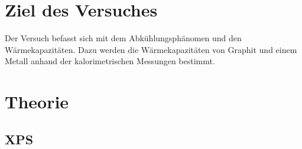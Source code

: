 \documentclass[12pt]{article}
\begin{document}
\section{Ziel des Versuches}
Der Versuch befasst sich mit dem Abkühlungsphänomen und den Wärmekapazitäten.
Dazu werden die Wärmekapazitäten von Graphit und einem Metall anhand der kalorimetrischen Messungen bestimmt.
\section {Theorie}
\subsection{XPS}
\end{document}
